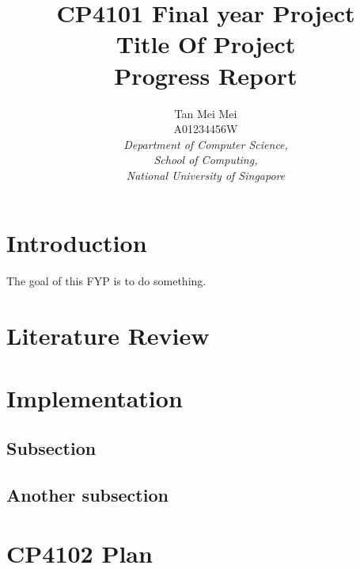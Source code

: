 \documentclass[a4paper,12pt]{nurop}
\begin{document}
\newcommand{\bomega}{\boldsymbol{\omega}}

\title{CP4101 Final year Project \\
	Title Of Project\\
	Progress Report}

\author{\large{Tan Mei Mei} \\ A01234456W \\ 
	\normalsize\textit{Department of Computer Science,\\
	School of Computing,\\
	National University of Singapore} 
}
\maketitle


\section{Introduction}
The goal of this FYP is to do something.

\section {Literature Review}

\section{Implementation}

\subsection{Subsection}


\subsection{Another subsection}

\section{CP4102 Plan}



\newpage



\end{document}
